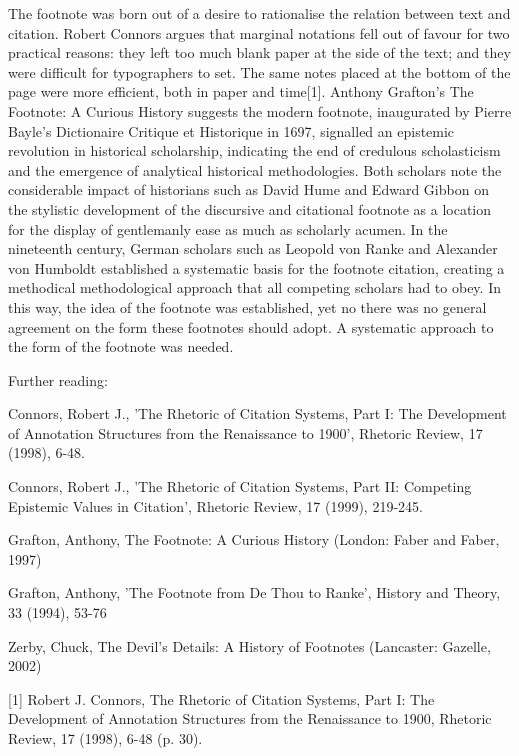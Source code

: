 {The footnote was born out of a desire to rationalise the relation between text and citation. Robert Connors argues that marginal notations fell out of favour for two practical reasons: they left too much blank paper at the side of the text; and they were difficult for typographers to set. The same notes placed at the bottom of the page were more efficient, both in paper and time[1]. Anthony Grafton's The Footnote: A Curious History suggests the modern footnote, inaugurated by Pierre Bayle's Dictionaire Critique et Historique in 1697, signalled an epistemic revolution in historical scholarship, indicating the end of credulous scholasticism and the emergence of analytical historical methodologies. Both scholars note the considerable impact of historians such as David Hume and Edward Gibbon on the stylistic development of the discursive and citational footnote as a location for the display of gentlemanly ease as much as scholarly acumen. In the nineteenth century, German scholars such as Leopold von Ranke and Alexander von Humboldt established a systematic basis for the footnote citation, creating a methodical methodological approach that all competing scholars had to obey. In this way, the idea of the footnote was established, yet no there was no general agreement on the form these footnotes should adopt. A systematic approach to the form of the footnote was needed.}

Further reading:

Connors, Robert J., 'The Rhetoric of Citation Systems, Part I: The Development of Annotation Structures from the Renaissance to 1900', Rhetoric Review, 17 (1998), 6-48.

Connors, Robert J., 'The Rhetoric of Citation Systems, Part II: Competing Epistemic Values in Citation', Rhetoric Review, 17 (1999), 219-245.

Grafton, Anthony, The Footnote: A Curious History (London: Faber and Faber, 1997)

Grafton, Anthony, 'The Footnote from De Thou to Ranke', History and Theory, 33 (1994), 53-76

Zerby, Chuck, The Devil's Details: A History of Footnotes (Lancaster: Gazelle, 2002)

[1] Robert J. Connors, The Rhetoric of Citation Systems, Part I: The Development of Annotation Structures from the Renaissance to 1900, Rhetoric Review, 17 (1998), 6-48 (p. 30).

